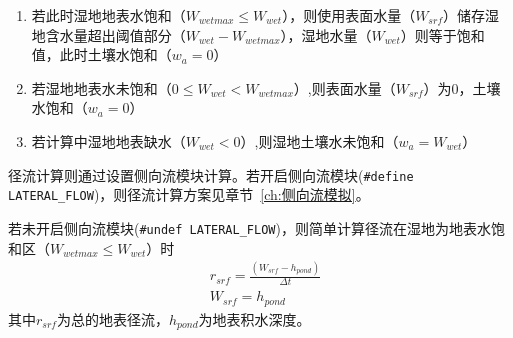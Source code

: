 \begin{enumerate}
    \item 若此时湿地地表水饱和（$W_{wetmax} \leq W_{wet}$），则使用表面水量（$W_{srf}$）储存湿地含水量超出阈值部分（$W_{wet}-W_{wetmax}$），湿地水量（$W_{wet}$）则等于饱和值，此时土壤水饱和（$w_{a}=0$）

    \item 若湿地地表水未饱和（$0 \leq W_{wet} < W_{wetmax}$）,则表面水量（$W_{srf}$）为0，土壤水饱和（$w_{a}=0$）

    \item 若计算中湿地地表缺水（$W_{wet} < 0$）,则湿地土壤水未饱和（$w_{a}=W_{wet}$）
\end{enumerate}

径流计算则通过设置侧向流模块计算。若开启侧向流模块(\texttt{\#define LATERAL\_FLOW})，则径流计算方案见章节~\ref{ch:侧向流模拟}。

若未开启侧向流模块(\texttt{\#undef LATERAL\_FLOW})，则简单计算径流在湿地为地表水饱和区（$W_{wetmax} \leq W_{wet}$）时
\begin{equation}
\begin{aligned}
&r_{srf}=\frac{\left(W_{srf}-h_{pond}\right)}{\Delta t} \\
&W_{srf}=h_{pond}
\end{aligned}
\end{equation}
其中$r_{srf}$为总的地表径流，$h_{pond}$为地表积水深度。